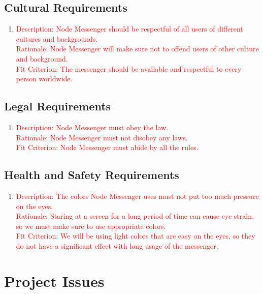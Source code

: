 \documentclass[12pt, titlepage]{article}
\begin{document}
    	\subsection{Cultural Requirements}
    	\begin{enumerate}[label=NFR\arabic*:, resume, leftmargin=1in]
    	\item \textcolor{red}{Description: Node Messenger should be respectful of all users of different cultures and backgrounds. \\
    		  Rationale: Node Messenger will make sure not to offend users of other culture and background. \\
    		  Fit Criterion: The messenger should be available and respectful to every person worldwide. }
    	\end{enumerate}
	    \subsection{Legal Requirements}
	    \begin{enumerate}[label=NFR\arabic*:, resume, leftmargin=1in]
    	\item \textcolor{red}{Description: Node Messenger must obey the law. \\
    		  Rationale: Node Messenger must not disobey any laws. \\
    		  Fit Criterion: Node Messenger must abide by all the rules.}
    	\end{enumerate}
    	\subsection{Health and Safety Requirements}
    	\begin{enumerate}[label=NFR\arabic*:, resume, leftmargin=1in]
    	\item \textcolor{red}{Description: The colors Node Messenger uses must not put too much pressure on the eyes. \\
    		  Rationale: Staring at a screen for a long period of time can cause eye strain, so we must make sure to use appropriate colors. \\
    		  Fit Criterion: We will be using light colors that are easy on the eyes, so they do not have a significant effect with long usage of the messenger.}
    	\end{enumerate}
	
	\newpage
	
\section{Project Issues}
\end{document}
